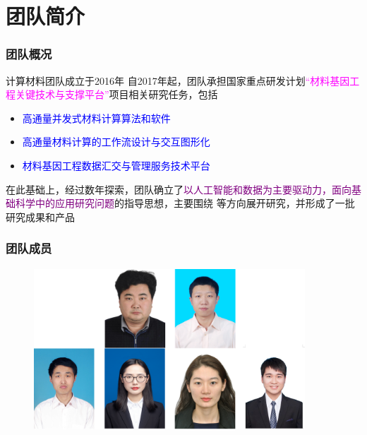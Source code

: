 \small
\section{团队简介}
\frame
{
	\frametitle{团队概况}
	计算材料团队成立于\textrm{2016}年
	\vskip 2pt 
	自\textrm{2017}年起，团队承担国家重点研发计划\textcolor{magenta}{``材料基因工程关键技术与支撑平台''}项目相关研究任务，包括
\begin{itemize}
		\item \textcolor{blue}{高通量并发式材料计算算法和软件}
		\item \textcolor{blue}{高通量材料计算的工作流设计与交互图形化}
		\item \textcolor{blue}{材料基因工程数据汇交与管理服务技术平台}
	\end{itemize}
	在此基础上，经过数年探索，团队确立了\textcolor{purple}{以人工智能和数据为主要驱动力，面向基础科学中的应用研究问题}的指导思想，主要围绕
	{\fontsize{7.2pt}{6.2pt}}
	等方向展开研究，并形成了一批研究成果和产品
}

\frame
{
	\frametitle{团队成员}
\begin{figure}[h!]
\vspace*{-0.10in}
\centering
\includegraphics[height=2.40in,width=4.00in,viewport=0 0 430 270,clip]{Figures/Team_Member.png}
\label{Team_Membwe}
\end{figure}
}

